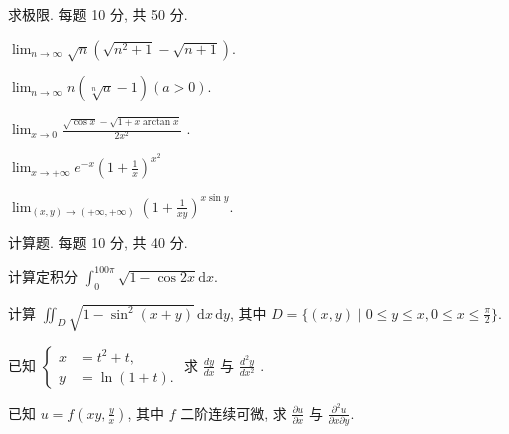 \par{}
求极限. 每题 10 分, 共 50 分.\par
$\lim_{n\to \infty}\sqrt{n}\left(\sqrt{n^2 + 1} -\sqrt{n + 1}\right).$\par
$\lim_{n\to\infty}n(\sqrt[n]{a}-1)(a>0).$\par
$\lim_{x\to0}\frac{\sqrt{\cos x}-\sqrt{1+x\arctan x}}{2x^{2}}$ .\par
$\lim_{x\to+\infty}e^{-x}\left(1+\frac{1}{x}\right)^{x^{2}}$\par
$\lim_{(x,y)\to(+\infty,+\infty)}\left(1+\frac{1}{xy}\right)^{x\sin y}.$\par
\par{}
计算题. 每题 10 分, 共 40 分.\par
计算定积分 $\int_0^{100\pi}\sqrt{1 - \cos 2x}\mathrm{d}x.$\par
计算 $\iint_{D} \sqrt{1 - \sin^2(x + y)} \, \mathrm{d}x \, \mathrm{d}y$, 其中 $D = \{(x, y) \mid 0 \leq y \leq x, 0 \leq x \leq \frac{\pi}{2}\}$.\par
已知  $\left\{\begin{aligned} x &= t^{2} + t, \\ y &= \ln(1 + t). \end{aligned}\right.$  求  $\frac{dy}{dx}$  与  $\frac{d^{2}y}{dx^{2}}$ .\par
已知 $u = f\left(xy, \frac{y}{x}\right)$, 其中 $f$ 二阶连续可微, 求 $\frac{\partial u}{\partial x}$ 与 $\frac{\partial^2 u}{\partial x \partial y}$.\par
\par{}
